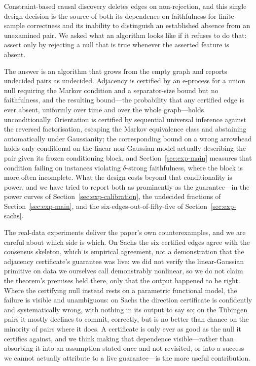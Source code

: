 Constraint-based causal discovery deletes edges on non-rejection, and this
single design decision is the source of both its dependence on faithfulness
for finite-sample correctness and its inability to distinguish an established
absence from an unexamined pair. We asked what an algorithm looks like if it
refuses to do that: assert only by rejecting a null that is true whenever the
asserted feature is absent.

The answer is an algorithm that grows from the empty graph and reports
undecided pairs as undecided. Adjacency is certified by an e-process for a
union null requiring the Markov condition and a separator-size bound but no
faithfulness, and the resulting bound---the probability that any certified
edge is ever absent, uniformly over time and over the whole graph---holds
unconditionally. Orientation is certified by sequential universal inference
against the reversed factorisation, escaping the Markov equivalence class and
abstaining automatically under Gaussianity; the corresponding bound on a
wrong arrowhead holds only conditional on the linear non-Gaussian model
actually describing the pair given its frozen conditioning block, and
Section~\ref{sec:exp-main} measures that condition failing on instances
violating $\delta$-strong faithfulness, where the block is more often
incomplete. What the design costs beyond that conditionality is power, and we
have tried to report both as prominently as the guarantee---in the power
curves of Section~\ref{sec:exp-calibration}, the undecided fractions of
Section~\ref{sec:exp-main}, and the six-edges-out-of-fifty-five of
Section~\ref{sec:exp-sachs}.

The real-data experiments deliver the paper's own counterexamples, and we are
careful about which side is which. On Sachs the six certified edges agree
with the consensus skeleton, which is empirical agreement, not a
demonstration that the adjacency certificate's guarantee was live: we did not
verify the linear-Gaussian primitive on data we ourselves call demonstrably
nonlinear, so we do not claim the theorem's premises held there, only that
the output happened to be right. Where the certifying null instead rests on
a parametric functional model, the failure is visible and unambiguous: on
Sachs the direction certificate is confidently and systematically wrong,
with nothing in its output to say so; on the Tübingen pairs it mostly
declines to commit, correctly, but is no better than chance on the minority
of pairs where it does. A certificate is only ever as good as the null it
certifies against, and we think making that dependence visible---rather than
absorbing it into an assumption stated once and not revisited, or into a
success we cannot actually attribute to a live guarantee---is the more
useful contribution.

